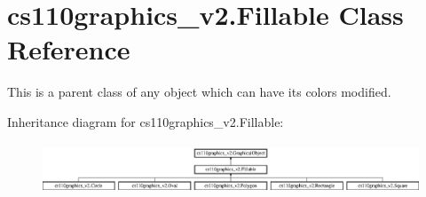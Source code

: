 \hypertarget{classcs110graphics__v2_1_1Fillable}{}\section{cs110graphics\+\_\+v2.\+Fillable Class Reference}
\label{classcs110graphics__v2_1_1Fillable}


This is a parent class of any object which can have its colors modified.  


Inheritance diagram for cs110graphics\+\_\+v2.\+Fillable\+:\begin{figure}[H]
\begin{center}
\leavevmode
\includegraphics[height=1.527273cm]{classcs110graphics__v2_1_1Fillable}
\end{center}
\end{figure}
